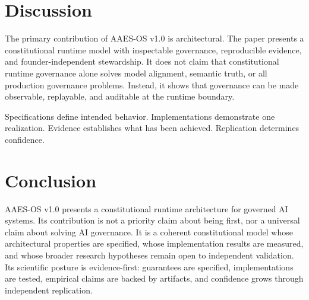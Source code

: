 \documentclass{article}
\begin{document}
\section{Discussion}
The primary contribution of AAES-OS v1.0 is architectural. The paper presents a constitutional runtime model with inspectable governance, reproducible evidence, and founder-independent stewardship. It does not claim that constitutional runtime governance alone solves model alignment, semantic truth, or all production governance problems. Instead, it shows that governance can be made observable, replayable, and auditable at the runtime boundary.

Specifications define intended behavior. Implementations demonstrate one realization. Evidence establishes what has been achieved. Replication determines confidence.

\section{Conclusion}
AAES-OS v1.0 presents a constitutional runtime architecture for governed AI systems. Its contribution is not a priority claim about being first, nor a universal claim about solving AI governance. It is a coherent constitutional model whose architectural properties are specified, whose implementation results are measured, and whose broader research hypotheses remain open to independent validation. Its scientific posture is evidence-first: guarantees are specified, implementations are tested, empirical claims are backed by artifacts, and confidence grows through independent replication.



\end{document}
